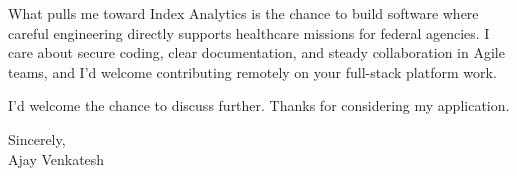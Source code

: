 \documentclass[letterpaper,11pt]{article}
\begin{document}
What pulls me toward Index Analytics is the chance to build software where careful engineering directly supports healthcare missions for federal agencies. I care about secure coding, clear documentation, and steady collaboration in Agile teams, and I'd welcome contributing remotely on your full-stack platform work.

I'd welcome the chance to discuss further. Thanks for considering my application.

\vspace{12pt}
Sincerely, \\
Ajay Venkatesh
\end{document}
